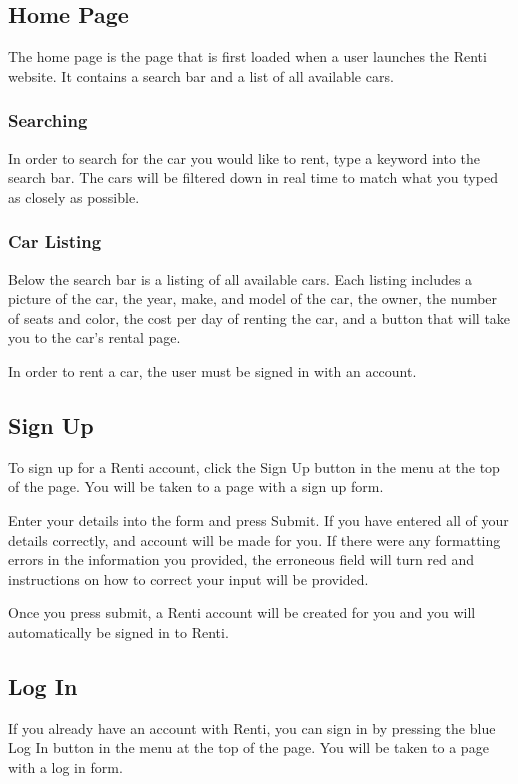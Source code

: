 \documentclass{article}
\begin{document}
\subsection{Home Page}
The home page is the page that is first loaded when a user launches the Renti website. It contains a search bar and a list of all available cars.

\subsubsection{Searching}
In order to search for the car you would like to rent, type a keyword into the search bar. The cars will be filtered down in real time to match what you typed as closely as possible.

\subsubsection{Car Listing}
Below the search bar is a listing of all available cars. Each listing includes a picture of the car, the year, make, and model of the car, the owner, the number of seats and color, the cost per day of renting the car, and a button that will take you to the car's rental page.

In order to rent a car, the user must be signed in with an account.

\subsection{Sign Up}
To sign up for a Renti account, click the Sign Up button in the menu at the top of the page. You will be taken to a page with a sign up form.

Enter your details into the form and press Submit. If you have entered all of your details correctly, and account will be made for you. If there were any formatting errors in the information you provided, the erroneous field will turn red and instructions on how to correct your input will be provided.

Once you press submit, a Renti account will be created for you and you will automatically be signed in to Renti.

\subsection{Log In}
If you already have an account with Renti, you can sign in by pressing the blue Log In button in the menu at the top of the page. You will be taken to a page with a log in form.
\end{document}
